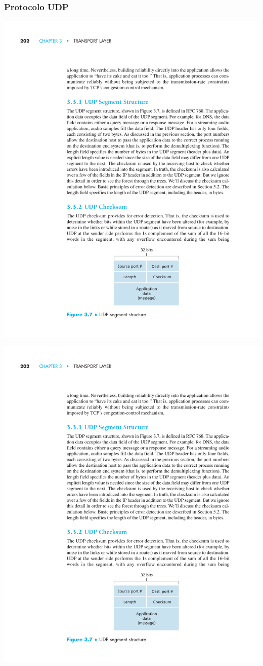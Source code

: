 \documentclass[xcolor=dvipsnames,10pt,compress,aspectratio=169]{beamer}
\begin{document}
\begin{frame}
  \frametitle{Protocolo UDP}
{
  \begin{center}
  \includegraphics[scale=1.5]{kurose-03-07}
  \end{center}
}
{
  \begin{center}
  \includegraphics[scale=1]{kurose-03-07}

\end{center}}
\end{frame}
\end{document}
